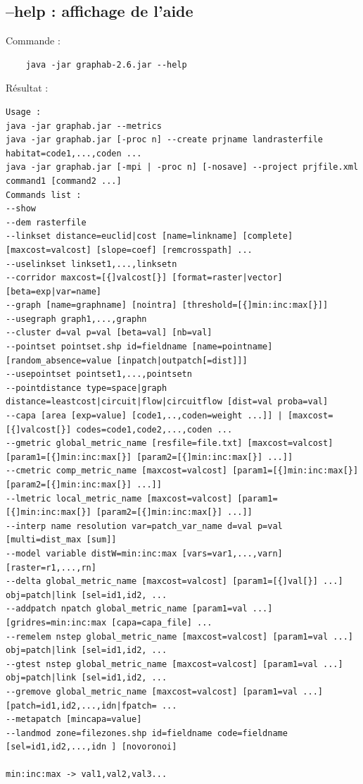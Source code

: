 \documentclass[a4paper,10pt]{report}
\begin{document}
\subsection{--help : affichage de l'aide}
Commande :
\begin{Verbatim}
	java -jar graphab-2.6.jar --help
\end{Verbatim}
Résultat :
\begin{verbatim}
Usage :
java -jar graphab.jar --metrics
java -jar graphab.jar [-proc n] --create prjname landrasterfile habitat=code1,...,coden ...
java -jar graphab.jar [-mpi | -proc n] [-nosave] --project prjfile.xml command1 [command2 ...]
Commands list :
--show
--dem rasterfile
--linkset distance=euclid|cost [name=linkname] [complete] [maxcost=valcost] [slope=coef] [remcrosspath] ...
--uselinkset linkset1,...,linksetn
--corridor maxcost=[{]valcost[}] [format=raster|vector] [beta=exp|var=name]
--graph [name=graphname] [nointra] [threshold=[{]min:inc:max[}]]
--usegraph graph1,...,graphn
--cluster d=val p=val [beta=val] [nb=val]
--pointset pointset.shp id=fieldname [name=pointname] [random_absence=value [inpatch|outpatch[=dist]]]
--usepointset pointset1,...,pointsetn
--pointdistance type=space|graph distance=leastcost|circuit|flow|circuitflow [dist=val proba=val]
--capa [area [exp=value] [code1,..,coden=weight ...]] | [maxcost=[{]valcost[}] codes=code1,code2,...,coden ...
--gmetric global_metric_name [resfile=file.txt] [maxcost=valcost] [param1=[{]min:inc:max[}] [param2=[{]min:inc:max[}] ...]]
--cmetric comp_metric_name [maxcost=valcost] [param1=[{]min:inc:max[}] [param2=[{]min:inc:max[}] ...]]
--lmetric local_metric_name [maxcost=valcost] [param1=[{]min:inc:max[}] [param2=[{]min:inc:max[}] ...]]
--interp name resolution var=patch_var_name d=val p=val [multi=dist_max [sum]]
--model variable distW=min:inc:max [vars=var1,...,varn] [raster=r1,...,rn]
--delta global_metric_name [maxcost=valcost] [param1=[{]val[}] ...] obj=patch|link [sel=id1,id2, ...
--addpatch npatch global_metric_name [param1=val ...] [gridres=min:inc:max [capa=capa_file] ...
--remelem nstep global_metric_name [maxcost=valcost] [param1=val ...] obj=patch|link [sel=id1,id2, ...
--gtest nstep global_metric_name [maxcost=valcost] [param1=val ...] obj=patch|link [sel=id1,id2, ...
--gremove global_metric_name [maxcost=valcost] [param1=val ...] [patch=id1,id2,...,idn|fpatch= ...
--metapatch [mincapa=value]
--landmod zone=filezones.shp id=fieldname code=fieldname [sel=id1,id2,...,idn ] [novoronoi]

min:inc:max -> val1,val2,val3...
\end{verbatim}
\end{document}
